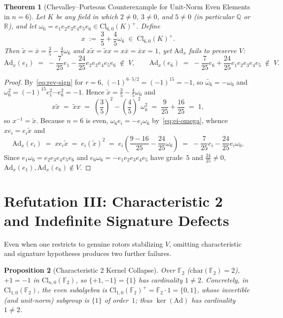 \documentclass[11pt]{article}
\newtheorem{theorem}{Theorem}[section]
\newtheorem{proposition}[theorem]{Proposition}
\theoremstyle{definition}
\theoremstyle{remark}
\newcommand{\Cl}{\mathrm{Cl}}
\newcommand{\Ad}{\mathrm{Ad}}
\begin{document}
\begin{theorem}[Chevalley--Porteous Counterexample for Unit-Norm Even Elements in $n = 6$]\label{thm:cl60-counterexample}
Let $K$ be any field in which $2 \ne 0$, $3 \ne 0$, and $5 \ne 0$ (in particular $\mathbb{Q}$ or $\mathbb{R}$), and let $\omega_6 = e_1 e_2 e_3 e_4 e_5 e_6 \in \Cl_{6,0}(K)^+$. Define
\[
x \;:=\; \frac{3}{5} + \frac{4}{5} \omega_6 \;\in\; \Cl_{6,0}(K)^+.
\]
Then $\widetilde{x} = \overline{x} = \frac{3}{5} - \frac{4}{5} \omega_6$ and $x \widetilde{x} = \widetilde{x} x = x \overline{x} = \overline{x} x = 1$, yet $\Ad_x$ fails to preserve $V$:
\[
\Ad_x(e_1) \;=\; -\frac{7}{25} e_1 - \frac{24}{25} e_2 e_3 e_4 e_5 e_6 \;\notin\; V, \qquad
\Ad_x(e_6) \;=\; -\frac{7}{25} e_6 + \frac{24}{25} e_1 e_2 e_3 e_4 e_5 \;\notin\; V.
\]
\end{theorem}

\begin{proof}
By~\eqref{eq:rev-sign} for $r = 6$, $(-1)^{6 \cdot 5 / 2} = (-1)^{15} = -1$, so $\widetilde{\omega_6} = -\omega_6$ and $\omega_6^2 = (-1)^{15} e_1^2 \cdots e_6^2 = -1$. Hence $\widetilde{x} = \frac{3}{5} - \frac{4}{5} \omega_6$ and
\[
x \widetilde{x} \;=\; \widetilde{x} x \;=\; \left(\frac{3}{5}\right)^2 - \left(\frac{4}{5}\right)^2 \omega_6^2 \;=\; \frac{9}{25} + \frac{16}{25} \;=\; 1,
\]
so $x^{-1} = \widetilde{x}$. Because $n = 6$ is even, $\omega_6 e_i = -e_i \omega_6$ by~\eqref{eq:ei-omega}, whence $x e_i = e_i \widetilde{x}$ and
\[
\Ad_x(e_i) \;=\; x e_i \widetilde{x} \;=\; e_i (\widetilde{x})^2 \;=\; e_i \left(\frac{9 - 16}{25} - \frac{24}{25}\omega_6\right) \;=\; -\frac{7}{25} e_i - \frac{24}{25} e_i \omega_6.
\]
Since $e_1 \omega_6 = e_2 e_3 e_4 e_5 e_6$ and $e_6 \omega_6 = -e_1 e_2 e_3 e_4 e_5$ have grade~$5$ and $\frac{24}{25} \ne 0$, $\Ad_x(e_1), \Ad_x(e_6) \notin V$.
\end{proof}

\section{Refutation III: Characteristic 2 and Indefinite Signature Defects}

Even when one restricts to genuine rotors stabilizing $V$, omitting characteristic and signature hypotheses produces two further failures.

\begin{proposition}[Characteristic $2$ Kernel Collapse]\label{prop:char2}
Over $\mathbb{F}_2$ ($\mathrm{char}(\mathbb{F}_2) = 2$), $+1 = -1$ in $\Cl_{n,0}(\mathbb{F}_2)$, so $\{+1, -1\} = \{1\}$ has cardinality $1 \ne 2$. Concretely, in $\Cl_{1,0}(\mathbb{F}_2)$, the even subalgebra is $\Cl_{1,0}(\mathbb{F}_2)^+ = \mathbb{F}_2 \cdot 1 = \{0, 1\}$, whose invertible (and unit-norm) subgroup is $\{1\}$ of order~$1$; thus $\ker(\Ad)$ has cardinality $1 \ne 2$.
\end{proposition}
\end{document}
